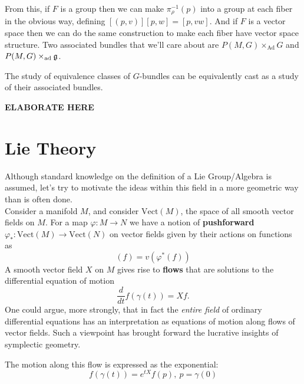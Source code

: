 		From this, if $F$ is a group then we can make $\pi_\rho^{-1}(p)$ into a group at each fiber in the obvious way, defining $[(p, v)][p, w] = [p, v w]$. And if $F$ is a vector space then we can do the same construction to make each fiber have vector space structure.		
		Two associated bundles that we'll care about are $P(M,G) \times_{\mathrm{Ad}} G$ and $P(M,G) \times_{\mathrm{ad}} \frak g$.
		
		The study of equivalence classes of $G$-bundles can be equivalently cast as a study of their associated bundles. 
		
		\textbf{ELABORATE HERE}
		
		\section{Lie Theory}
		
		Although standard knowledge on the definition of a Lie Group/Algebra is assumed, let's try to motivate the ideas within this field in a more geometric way than is often done. \\
		
		Consider a manifold $M$, and consider $\text{Vect}(M)$, the space of all smooth vector fields on $M$. For a map $\varphi: M \rightarrow N$ we have a notion of \textbf{pushforward} $\varphi_*: \text{Vect}(M) \rightarrow \text{Vect}(N)$ on vector fields given by their actions on functions as
		\begin{equation}
			[\varphi_* (v)] (f) = v (\varphi^* (f))
		\end{equation}
		A smooth vector field $X$ on $M$ gives rise to \textbf{flows} that are solutions to the differential equation of motion
		\begin{equation}
			\frac{d}{dt} f(\gamma(t)) = X f.
		\end{equation}
		One could argue, more strongly, that in fact the \emph{entire field} of ordinary differential equations has an interpretation as equations of motion along flows of vector fields. Such a viewpoint has brought forward the lucrative insights of symplectic geometry. 
		
		The motion along this flow is expressed as the exponential:
		\begin{equation}
			f(\gamma(t)) = e^{t X} f(p), ~ p = \gamma(0)
		\end{equation}
		
